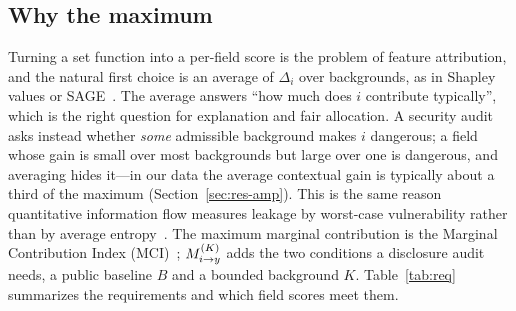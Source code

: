 \subsection{Why the maximum}
Turning a set function into a per-field score is the problem of feature attribution, and the
natural first choice is an average of $\Delta_i$ over backgrounds, as in Shapley values or
SAGE~\cite{covert2020sage}. The average answers ``how much does $i$ contribute typically'', which is
the right question for explanation and fair allocation. A security audit asks instead whether
\emph{some} admissible background makes $i$ dangerous; a field whose gain is small over most
backgrounds but large over one is dangerous, and averaging hides it---in our data the average
contextual gain is typically about a third of the maximum (Section~\ref{sec:res-amp}). This is the
same reason quantitative information flow measures leakage by worst-case
vulnerability rather than by average entropy~\cite{smith2009qif,alvim2012gleakage}. The maximum
marginal contribution is the Marginal Contribution Index (MCI)~\cite{catav2021mci}; $M^{(K)}_{i \to y}$ adds the
two conditions a disclosure audit needs, a public baseline $B$ and a bounded background $K$.
Table~\ref{tab:req} summarizes the requirements and which field scores meet them.

\begin{table}[!tbp]
\centering\small
\caption{Requirements for a field-level inference-risk quantity. \checkmark: satisfied;
$\circ$: partially; --: not satisfied.}\label{tab:req}
\end{table}

